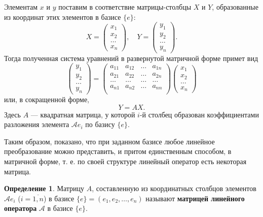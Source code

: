 \documentclass[a5paper, 11pt]{extbook}
\theoremstyle{definition}
\theoremstyle{definition}
\newtheorem{definition}{Определение}[chapter]
\begin{document}
Элементам \(x\) и \(y\) поставим в соответствие матрицы-столбцы \(X\) и \(Y\), образованные из координат этих элементов в базисе \(\{e\}\):
\[
    X =
    \begin{pmatrix}
        x_1    \\
        x_2    \\
        \ldots \\
        x_n
    \end{pmatrix},
    \quad
    Y =
    \begin{pmatrix}
        y_1    \\
        y_2    \\
        \ldots \\
        y_n
    \end{pmatrix}.
\]
Тогда полученная система уравнений в развернутой матричной форме примет вид
\[
    \begin{pmatrix}
        y_1    \\
        y_2    \\
        \ldots \\
        y_n
    \end{pmatrix}
    =
    \begin{pmatrix}
        a_{11} & a_{12} & \ldots & a_{1n} \\
        a_{21} & a_{22} & \ldots & a_{2n} \\
        \ldots & \ldots & \ldots & \ldots \\
        a_{n1} & a_{n2} & \ldots & a_{nn} \\
    \end{pmatrix}
    \begin{pmatrix}
        x_1    \\
        x_2    \\
        \ldots \\
        x_n
    \end{pmatrix}
\]
или, в сокращенной форме,
\[
    Y = AX.
\]
Здесь \(A\) — квадратная матрица, у которой \(i\)-й столбец образован коэффициентами разложения элемента \(\mathcal{A} e_i\) по базису \(\{e\}\).

Таким образом, показано, что при заданном базисе любое линейное преобразование можно представить, и притом единственным способом, в матричной форме, т. е. по своей структуре линейный оператор есть некоторая матрица.

\begin{definition}
    Матрицу \(A\), составленную из координатных столбцов элементов \(\mathcal{A} e_i\) (\(i = \overline{1, n}\)) в базисе \(\{e\} = (e_1, e_2, \ldots, e_n)\) называют \textbf{матрицей линейного оператора} \(\mathcal{A}\) в базисе \(\{e\}\).
\end{definition}
\end{document}
